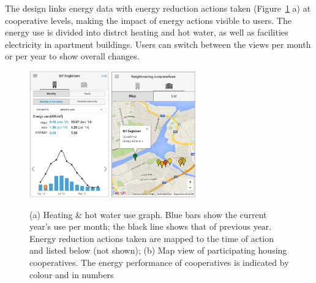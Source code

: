 
The design links energy data with energy reduction actions taken (Figure~\ref{fig:Figure201_Actions} a) at cooperative levels, making the impact of energy actions visible to users. The energy use is divided into distrct heating and hot water, as well as facilities electricity in apartment buildings. Users can switch between the views per month or per year to show overall changes. %
%
\begin{figure}[t!]
	\sidecaption[t]
	\includegraphics[height=5.45cm]{img/Figure201_Actions.png}
		\includegraphics[height=5.42cm]{img/Figure202_Housing_cooperatives_comparison.png}
	\caption{ (a) Heating \& hot water use graph. Blue bars show the current year's use per month; the black line shows that of previous year. Energy reduction actions taken are mapped to the time of action and listed below (not shown); (b) Map view of participating housing cooperatives. The energy performance of cooperatives is indicated by colour and in numbers}
	\label{fig:Figure201_Actions}
\end{figure}
